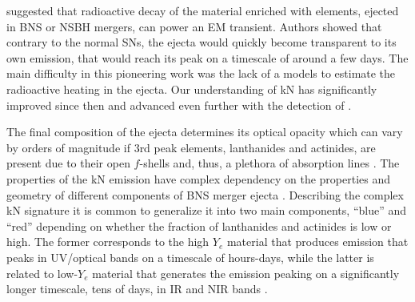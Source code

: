 \citet{Li:1998bw} suggested that 
radioactive decay of the material enriched with \rproc{} elements,
ejected in \ac{BNS} or \ac{NSBH} mergers, can power an \ac{EM} transient.
%
Authors showed that contrary to the normal \acp{SN}, 
the ejecta would quickly become transparent to its own emission, 
that would reach its peak on a timescale of around a few days. 
%
The main difficulty in this pioneering work was the lack of a \nuc{}
models to estimate the radioactive heating in the ejecta. 
%
Our understanding of \ac{kN} has significantly improved since then
\citep[\eg][]{Kulkarni:2005jw,Metzger:2010,Roberts:2011,Metzger:2016pju,Wollaeger:2017ahm} 
and advanced even further with the detection of \AT{} \citep[\eg][]{Metzger:2019zeh}.

The final composition of the ejecta determines its optical opacity 
which can vary by orders of magnitude if $3$rd peak elements, 
lanthanides 
and actinides, 
are present 
due to their open $f$-shells and, thus, a plethora of 
absorption lines \citep{Tanaka:2013ana,Kasen:2013xka}.
%
The properties of the \ac{kN} emission have complex 
dependency on the properties and geometry of different components of 
\ac{BNS} merger ejecta \citep{Metzger:2019zeh}.
%
Describing the complex \ac{kN} signature it is common to 
generalize it into two main components, ``blue'' and ``red'' 
depending on whether the fraction of lanthanides and actinides is low or high.
%
The former corresponds to the high $Y_e$ material that produces emission 
that peaks in \ac{UV}/optical bands on a timescale of hours-days, 
while the latter is related to low-$Y_e$ material that generates the 
emission peaking on a significantly 
longer timescale, tens of days, in \ac{IR} and \ac{NIR} bands
\citep{Barnes:2013wka,Grossman:2013lqa,Lippuner:2015gwa}.

